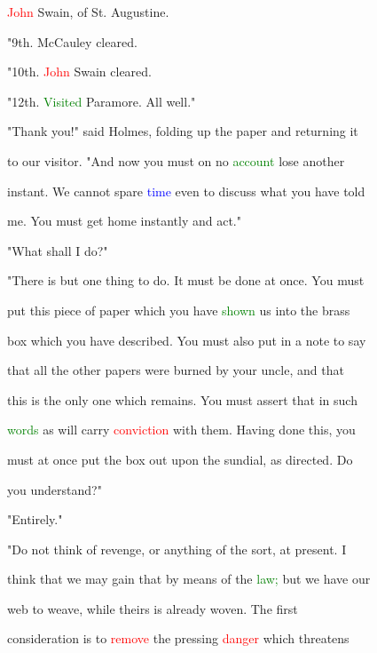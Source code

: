  \textcolor{red}{John} Swain, of St. Augustine.



 "9th. McCauley cleared.



 "10th. \textcolor{red}{John} Swain cleared.



 "12th. \textcolor{green}{Visited} Paramore. All well."



 "Thank you!" said Holmes, folding up the paper and returning it

 to our \textcolor{BurntOrange}{visitor.} "And now you must on no \textcolor{green}{account} \textcolor{BurntOrange}{lose} another

 instant. We cannot spare \textcolor{blue}{time} even to discuss what you have told

 me. You must get home instantly and act."



 "What shall I do?"



 "There is but one thing to do. It must be done at once. You must

 put this piece of paper which you have \textcolor{green}{shown} us into the brass

 box which you have described. You must also put in a note to say

 that all the other papers were burned by your uncle, and that

 this is the only one which \textcolor{BurntOrange}{remains.} You must assert that in such

 \textcolor{green}{words} as will carry \textcolor{red}{conviction} with them. Having done this, you

 must at once put the box out upon the \textcolor{BurntOrange}{sundial,} as directed. Do

 you understand?"



 "Entirely."



 "Do not think of \textcolor{BurntOrange}{revenge,} or anything of the sort, at \textcolor{BurntOrange}{present.} I

 think that we may \textcolor{BurntOrange}{gain} that by means of the \textcolor{green}{law;} but we have our

 web to weave, while theirs is already woven. The first

 consideration is to \textcolor{red}{remove} the pressing \textcolor{red}{danger} which threatens

